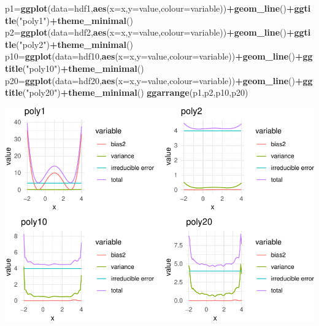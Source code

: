 \documentclass[]{article}
\newenvironment{Shaded}{\begin{snugshade}}{\end{snugshade}}
\newcommand{\KeywordTok}[1]{\textcolor[rgb]{0.13,0.29,0.53}{\textbf{#1}}}
\newcommand{\DataTypeTok}[1]{\textcolor[rgb]{0.13,0.29,0.53}{#1}}
\newcommand{\StringTok}[1]{\textcolor[rgb]{0.31,0.60,0.02}{#1}}
\newcommand{\OperatorTok}[1]{\textcolor[rgb]{0.81,0.36,0.00}{\textbf{#1}}}
\newcommand{\NormalTok}[1]{#1}
\begin{document}
\begin{Shaded}
\begin{Highlighting}[]
\NormalTok{p1=}\KeywordTok{ggplot}\NormalTok{(}\DataTypeTok{data=}\NormalTok{hdf1,}\KeywordTok{aes}\NormalTok{(}\DataTypeTok{x=}\NormalTok{x,}\DataTypeTok{y=}\NormalTok{value,}\DataTypeTok{colour=}\NormalTok{variable))}\OperatorTok{+}\KeywordTok{geom_line}\NormalTok{()}\OperatorTok{+}\KeywordTok{ggtitle}\NormalTok{(}\StringTok{"poly1"}\NormalTok{)}\OperatorTok{+}\KeywordTok{theme_minimal}\NormalTok{()}
\NormalTok{p2=}\KeywordTok{ggplot}\NormalTok{(}\DataTypeTok{data=}\NormalTok{hdf2,}\KeywordTok{aes}\NormalTok{(}\DataTypeTok{x=}\NormalTok{x,}\DataTypeTok{y=}\NormalTok{value,}\DataTypeTok{colour=}\NormalTok{variable))}\OperatorTok{+}\KeywordTok{geom_line}\NormalTok{()}\OperatorTok{+}\KeywordTok{ggtitle}\NormalTok{(}\StringTok{"poly2"}\NormalTok{)}\OperatorTok{+}\KeywordTok{theme_minimal}\NormalTok{()}
\NormalTok{p10=}\KeywordTok{ggplot}\NormalTok{(}\DataTypeTok{data=}\NormalTok{hdf10,}\KeywordTok{aes}\NormalTok{(}\DataTypeTok{x=}\NormalTok{x,}\DataTypeTok{y=}\NormalTok{value,}\DataTypeTok{colour=}\NormalTok{variable))}\OperatorTok{+}\KeywordTok{geom_line}\NormalTok{()}\OperatorTok{+}\KeywordTok{ggtitle}\NormalTok{(}\StringTok{"poly10"}\NormalTok{)}\OperatorTok{+}\KeywordTok{theme_minimal}\NormalTok{()}
\NormalTok{p20=}\KeywordTok{ggplot}\NormalTok{(}\DataTypeTok{data=}\NormalTok{hdf20,}\KeywordTok{aes}\NormalTok{(}\DataTypeTok{x=}\NormalTok{x,}\DataTypeTok{y=}\NormalTok{value,}\DataTypeTok{colour=}\NormalTok{variable))}\OperatorTok{+}\KeywordTok{geom_line}\NormalTok{()}\OperatorTok{+}\KeywordTok{ggtitle}\NormalTok{(}\StringTok{"poly20"}\NormalTok{)}\OperatorTok{+}\KeywordTok{theme_minimal}\NormalTok{()}
\KeywordTok{ggarrange}\NormalTok{(p1,p2,p10,p20)}
\end{Highlighting}
\end{Shaded}

\includegraphics{RecEx2-sol_files/figure-latex/unnamed-chunk-14-1.pdf}
\end{document}
